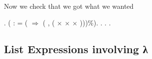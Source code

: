 Now we check that we got what we wanted \begin{coqdoccode}
\coqdocemptyline
\coqdocindent{2.00em}
   .\coqdoceol
\coqdocindent{2.00em}
 (\coqdoceol
\coqdocindent{5.00em}
: \coqdoceol
\coqdocindent{6.00em}
= (  \ensuremath{\Rightarrow}\coqdoceol
\coqdocindent{8.50em}
(\coqdocvar{\ensuremath{\lambda}}  ,  (  \ensuremath{\times}   \ensuremath{\times}   \ensuremath{\times}  )))\%).\coqdoceol
\coqdocindent{1.00em}
.\coqdoceol
\coqdocnoindent
{} .\coqdoceol
\coqdocemptyline
\coqdocnoindent
{} .\coqdoceol
\end{coqdoccode}
\subsection{List Expressions involving λ}

